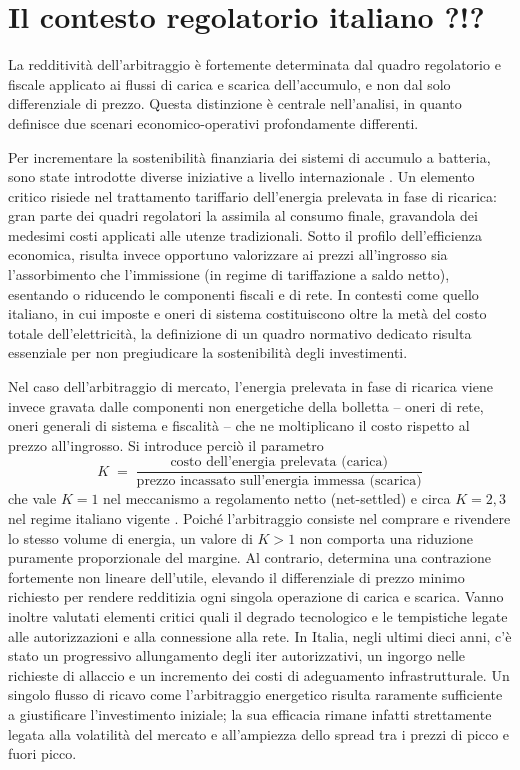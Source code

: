 \section{Il contesto regolatorio italiano ?!?}
\label{sec:contesto-italiano}

La redditività dell'arbitraggio è fortemente determinata dal quadro regolatorio e fiscale applicato ai flussi di carica e scarica dell'accumulo, e non dal solo differenziale di prezzo. Questa distinzione è centrale nell'analisi, in quanto definisce due scenari economico-operativi profondamente differenti.

Per incrementare la sostenibilità finanziaria dei sistemi di accumulo a batteria, sono state introdotte diverse iniziative a livello internazionale \cite{en16217272}. Un elemento critico risiede nel trattamento tariffario dell'energia prelevata in fase di ricarica: gran parte dei quadri regolatori la assimila al consumo finale, gravandola dei medesimi costi applicati alle utenze tradizionali. Sotto il profilo dell'efficienza economica, risulta invece opportuno valorizzare ai prezzi all'ingrosso sia l'assorbimento che l'immissione (in regime di tariffazione a saldo netto), esentando o riducendo le componenti fiscali e di rete. In contesti come quello italiano, in cui imposte e oneri di sistema costituiscono oltre la metà del costo totale dell'elettricità, la definizione di un quadro normativo dedicato risulta essenziale per non pregiudicare la sostenibilità degli investimenti.

Nel caso dell'arbitraggio di mercato, l'energia prelevata in fase di ricarica viene invece gravata dalle componenti non energetiche della bolletta -- oneri di rete, oneri generali di sistema e fiscalità -- che ne moltiplicano il costo rispetto al
prezzo all'ingrosso. Si introduce perciò il parametro
\begin{equation}
K \;=\; \frac{\text{costo dell'energia prelevata (carica)}}
             {\text{prezzo incassato sull'energia immessa (scarica)}}
\label{eq:kappa}
\end{equation}
che vale $K = 1$ nel meccanismo a regolamento netto (net-settled) e circa $K = 2,3$ nel regime italiano vigente \parencite{su18031404}. Poiché l'arbitraggio consiste nel comprare e rivendere lo stesso volume di energia, un valore di $K>1$ non comporta una riduzione puramente proporzionale del margine. Al contrario, determina una contrazione fortemente non lineare dell'utile, elevando il differenziale di prezzo minimo richiesto per rendere redditizia ogni singola operazione di carica e scarica. Vanno inoltre valutati elementi critici quali il degrado tecnologico e le tempistiche legate alle autorizzazioni e alla connessione alla rete. In Italia, negli ultimi dieci anni, c'è stato un progressivo allungamento degli iter autorizzativi, un ingorgo nelle richieste di allaccio e un incremento dei costi di adeguamento infrastrutturale. Un singolo flusso di ricavo come l'arbitraggio energetico risulta raramente sufficiente a giustificare l'investimento iniziale; la sua efficacia rimane infatti strettamente legata alla volatilità del mercato e all'ampiezza dello spread tra i prezzi di picco e fuori picco.

